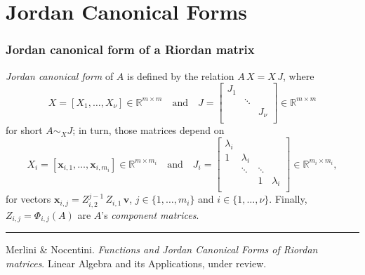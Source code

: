 \documentclass[9pt]{beamer}
\begin{document}
\section{Jordan Canonical Forms}

\begin{frame}[fragile]
\frametitle{Jordan canonical form of a Riordan matrix}
\textit{Jordan canonical
form} of $A$ is defined by the relation $A\,X = X\, J$, where
\begin{displaymath}
X = \left[X_{1},\ldots,X_{\nu} \right]\in\mathbb{R}^{m\times m} \quad\text{and}\quad
J = \left[ \begin{array}{ccc}
    J_{1} \\
      & \ddots \\
      & & J_{\nu} \\
\end{array} \right] \in\mathbb{R}^{m\times m}
\end{displaymath}
for short $A\sim_{X}J$; in turn, those matrices depend on
\begin{displaymath}
X_{i}   = \left[\boldsymbol{x}_{i,1},\ldots,\boldsymbol{x}_{i,m_{i}} \right]\in\mathbb{R}^{m\times m_{i}}\quad\text{and}\quad
J_{i}   = \left[ \begin{array}{cccc}
    \lambda_{i} \\
    1 & \lambda_{i} \\
      & \ddots & \ddots \\
      & & 1 &\lambda_{i} \\
\end{array} \right] \in\mathbb{R}^{m_{i}\times m_{i}},
\end{displaymath}
for vectors $\boldsymbol{x}_{i,j} =
    Z_{i,2}^{j-1}\,Z_{i,1}\,\boldsymbol{v}$, $j\in\lbrace1,\ldots,m_{i}\rbrace$ and
    $i\in \lbrace 1,\ldots,\nu \rbrace$. Finally, $Z_{i,j} = \Phi_{i,j}(A)$
    are $A$'s \textit{component matrices}.
\vfill
\noindent\rule{\textwidth}{0.1pt}
{\footnotesize
Merlini \& Nocentini. \textit{Functions and Jordan Canonical Forms of Riordan
matrices}. \newline Linear Algebra and its Applications, under review.}
\end{frame}
\end{document}
